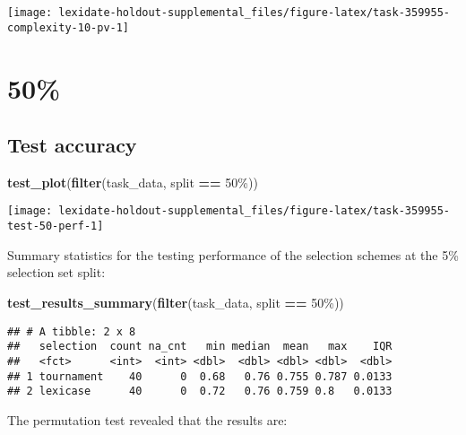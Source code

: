 \documentclass[
]{book}
\newenvironment{Shaded}{\begin{snugshade}}{\end{snugshade}}
\newcommand{\FunctionTok}[1]{\textcolor[rgb]{0.13,0.29,0.53}{\textbf{#1}}}
\newcommand{\NormalTok}[1]{#1}
\newcommand{\SpecialCharTok}[1]{\textcolor[rgb]{0.81,0.36,0.00}{\textbf{#1}}}
\newcommand{\StringTok}[1]{\textcolor[rgb]{0.31,0.60,0.02}{#1}}
\begin{document}
\texttt{[image: lexidate-holdout-supplemental\_files/figure-latex/task-359955-complexity-10-pv-1]}

\hypertarget{section-12}{%
\section{50\%}\label{section-12}}

\hypertarget{test-accuracy-12}{%
\subsection{Test accuracy}\label{test-accuracy-12}}

\begin{Shaded}
\begin{Highlighting}[]
\FunctionTok{test\_plot}\NormalTok{(}\FunctionTok{filter}\NormalTok{(task\_data, split }\SpecialCharTok{==} \StringTok{\textquotesingle{}50\%\textquotesingle{}}\NormalTok{))}
\end{Highlighting}
\end{Shaded}

\texttt{[image: lexidate-holdout-supplemental\_files/figure-latex/task-359955-test-50-perf-1]}

Summary statistics for the testing performance of the selection schemes at the 5\% selection set split:

\begin{Shaded}
\begin{Highlighting}[]
\FunctionTok{test\_results\_summary}\NormalTok{(}\FunctionTok{filter}\NormalTok{(task\_data, split }\SpecialCharTok{==} \StringTok{\textquotesingle{}50\%\textquotesingle{}}\NormalTok{))}
\end{Highlighting}
\end{Shaded}

\begin{verbatim}
## # A tibble: 2 x 8
##   selection  count na_cnt   min median  mean   max    IQR
##   <fct>      <int>  <int> <dbl>  <dbl> <dbl> <dbl>  <dbl>
## 1 tournament    40      0  0.68   0.76 0.755 0.787 0.0133
## 2 lexicase      40      0  0.72   0.76 0.759 0.8   0.0133
\end{verbatim}

The permutation test revealed that the results are:
\end{document}
